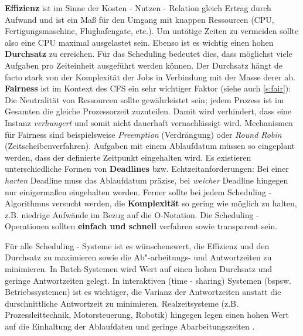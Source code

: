 \textbf{Effizienz} ist im Sinne der Kosten - Nutzen - Relation gleich Ertrag durch Aufwand und ist ein Maß für den Umgang mit knappen Ressourcen (CPU, Fertigungsmaschine, Flughafengate, etc.). Um untätige Zeiten zu vermeiden sollte also eine CPU maximal ausgelastet sein. Ebenso ist es wichtig einen hohen \textbf{Durchsatz} zu erreichen. Für das Scheduling bedeutet dies, dass möglichst viele Aufgaben pro Zeiteinheit ausgeführt werden können. Der Durchsatz hängt de facto stark von der Komplexität der Jobs in Verbindung mit der Masse derer ab. \textbf{Fairness} ist im Kontext des CFS ein sehr wichtiger Faktor (siehe auch \ref{s:fair}): Die Neutralität von Ressourcen sollte gewährleistet sein; jedem Prozess ist im Gesamten die gleiche Prozessorzeit zuzuteilen. Damit wird verhindert, dass eine Instanz \textit{verhungert} und somit nicht dauerhaft vernachlässigt wird. Mechanismen für Fairness sind beispielsweise \textit{Preemption} (Verdrängung) oder \textit{Round Robin} (Zeitscheibenverfahren). 
Aufgaben mit einem Ablaufdatum müssen so eingeplant werden, dass der definierte Zeitpunkt eingehalten wird. Es existieren unterschiedliche Formen von \textbf{Deadlines} bzw. Echtzeitanforderungen: Bei einer \textit{harten} Deadline muss das Ablaufdatum präzise, bei \textit{weicher} Deadline hingegen nur einigermaßen eingehalten werden. Ferner sollte bei jedem Scheduling - Algorithmus versucht werden, die \textbf{Komplexität} so gering wie möglich zu halten, z.B. niedrige Aufwände im Bezug auf die O-Notation. Die Scheduling - Operationen sollten \textbf{einfach und schnell} verfahren sowie transparent sein.  

Für alle Scheduling - Systeme ist es wünschenswert, die Effizienz und den Durchsatz zu maximieren sowie  die Ab"-arbeitungs- und Antwortzeiten zu minimieren. In Batch-Systemen wird Wert auf einen hohen Durchsatz und geringe Antwortzeiten gelegt. In interaktiven (time - sharing) Systemen (bspsw. Betriebssystemen) ist es wichtiger, die Varianz der Antwortzeiten anstatt die durschnittliche Antwortzeit zu minimieren. Realzeitsysteme (z.B. Prozessleittechnik, Motorsteuerung, Robotik) hingegen legen einen hohen Wert auf die Einhaltung der Ablaufdaten und geringe Abarbeitungszeiten \cite{asilberschatz}.\\


